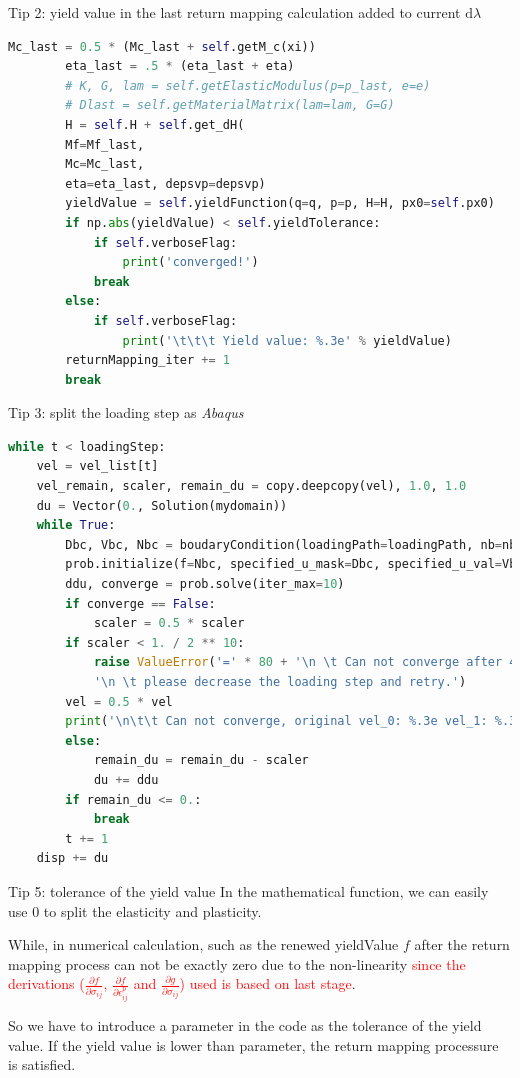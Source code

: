 \documentclass[aspectratio=169]{beamer}
\begin{document}
\begin{frame}[fragile]{Tip 2: yield value in the last return mapping calculation added to current $\mathrm{d} \lambda$}
	\begin{lstlisting}[language=Python,basicstyle=\tiny]
		Mc_last = 0.5 * (Mc_last + self.getM_c(xi))
		eta_last = .5 * (eta_last + eta)
		# K, G, lam = self.getElasticModulus(p=p_last, e=e)
		# Dlast = self.getMaterialMatrix(lam=lam, G=G)
		H = self.H + self.get_dH(
		Mf=Mf_last,
		Mc=Mc_last,
		eta=eta_last, depsvp=depsvp)
		yieldValue = self.yieldFunction(q=q, p=p, H=H, px0=self.px0)
		if np.abs(yieldValue) < self.yieldTolerance:
			if self.verboseFlag:
				print('converged!')
			break
		else:
			if self.verboseFlag:
				print('\t\t\t Yield value: %.3e' % yieldValue)
		returnMapping_iter += 1
		break
	\end{lstlisting}
\end{frame}

\begin{frame}[fragile]{Tip 3: split the loading step as \textit{Abaqus}}
	\begin{lstlisting}[language=Python,basicstyle=\tiny]
while t < loadingStep:
	vel = vel_list[t]
	vel_remain, scaler, remain_du = copy.deepcopy(vel), 1.0, 1.0
	du = Vector(0., Solution(mydomain))
	while True:
		Dbc, Vbc, Nbc = boudaryCondition(loadingPath=loadingPath, nb=nb, fb=fb, vel=vel)
		prob.initialize(f=Nbc, specified_u_mask=Dbc, specified_u_val=Vbc)
		ddu, converge = prob.solve(iter_max=10)
		if converge == False:
			scaler = 0.5 * scaler
		if scaler < 1. / 2 ** 10:
			raise ValueError('=' * 80 + '\n \t Can not converge after 4 times split.' +
			'\n \t please decrease the loading step and retry.')
		vel = 0.5 * vel
		print('\n\t\t Can not converge, original vel_0: %.3e vel_1: %.3e' % (2. * vel, vel))
		else:
			remain_du = remain_du - scaler
			du += ddu
		if remain_du <= 0.:
			break
		t += 1
	disp += du
	\end{lstlisting}
\end{frame}

\begin{frame}{Tip 5: tolerance of the yield value}
	In the mathematical function, we can easily use 0 to split the elasticity and plasticity.
	
	\vspace{2mm} 
	While, in numerical calculation, such as the renewed yieldValue $f$ after the return mapping process can not be exactly zero due to the non-linearity \textcolor{red}{since the derivations ($\frac{\partial f}{\partial \sigma_{ij}}$, $\frac{\partial f}{\partial \epsilon^p_{ij}}$ and $\frac{\partial g}{\partial \sigma_{ij}}$) used is based on last stage}.
	
	\vspace{2mm} 
	So we have to introduce a parameter in the code as the tolerance of the yield value. If the yield value is lower than parameter, the return mapping processure is satisfied. 
\end{frame}
\end{document}
